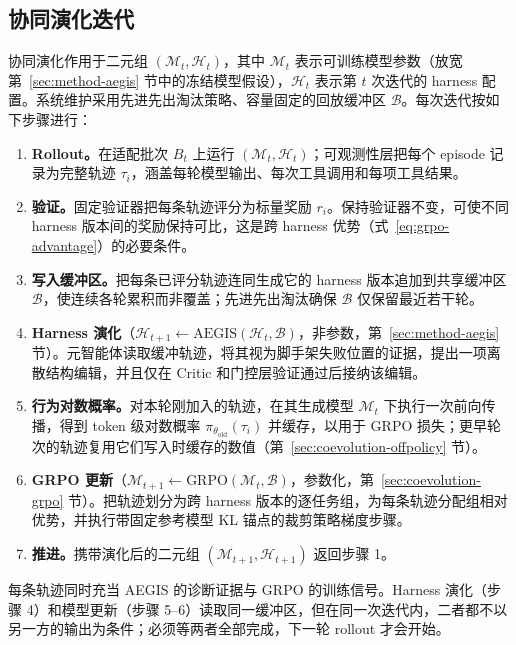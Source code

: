 \subsection{协同演化迭代}
\label{sec:coevolution-loop}

协同演化作用于二元组 $(\mathcal{M}_t,\mathcal{H}_t)$，其中 $\mathcal{M}_t$ 表示可训练模型参数（放宽第~\ref{sec:method-aegis} 节中的冻结模型假设），$\mathcal{H}_t$ 表示第 $t$ 次迭代的 harness 配置。系统维护采用先进先出淘汰策略、容量固定的回放缓冲区 $\mathcal{B}$。每次迭代按如下步骤进行：

\begin{enumerate}[leftmargin=*]
  \item \textbf{Rollout。}在适配批次 $B_t$ 上运行 $(\mathcal{M}_t,\mathcal{H}_t)$；可观测性层把每个 episode 记录为完整轨迹 $\tau_i$，涵盖每轮模型输出、每次工具调用和每项工具结果。
  \item \textbf{验证。}固定验证器把每条轨迹评分为标量奖励 $r_i$。保持验证器不变，可使不同 harness 版本间的奖励保持可比，这是跨 harness 优势（式~\ref{eq:grpo-advantage}）的必要条件。
  \item \textbf{写入缓冲区。}把每条已评分轨迹连同生成它的 harness 版本追加到共享缓冲区 $\mathcal{B}$，使连续各轮累积而非覆盖；先进先出淘汰确保 $\mathcal{B}$ 仅保留最近若干轮。
  \item \textbf{Harness 演化}（$\mathcal{H}_{t+1}\leftarrow\text{AEGIS}(\mathcal{H}_t,\mathcal{B})$，非参数，第~\ref{sec:method-aegis} 节）。元智能体读取缓冲轨迹，将其视为脚手架失败位置的证据，提出一项离散结构编辑，并且仅在 Critic 和门控层验证通过后接纳该编辑。
  \item \textbf{行为对数概率。}对本轮刚加入的轨迹，在其生成模型 $\mathcal{M}_t$ 下执行一次前向传播，得到 token 级对数概率 $\pi_{\theta_{\text{old}}}(\tau_i)$ 并缓存，以用于 GRPO 损失；更早轮次的轨迹复用它们写入时缓存的数值（第~\ref{sec:coevolution-offpolicy} 节）。
  \item \textbf{GRPO 更新}（$\mathcal{M}_{t+1}\leftarrow\text{GRPO}(\mathcal{M}_t,\mathcal{B})$，参数化，第~\ref{sec:coevolution-grpo} 节）。把轨迹划分为跨 harness 版本的逐任务组，为每条轨迹分配组相对优势，并执行带固定参考模型 KL 锚点的裁剪策略梯度步骤。
  \item \textbf{推进。}携带演化后的二元组 $(\mathcal{M}_{t+1},\mathcal{H}_{t+1})$ 返回步骤 1。
\end{enumerate}

每条轨迹同时充当 AEGIS 的诊断证据与 GRPO 的训练信号。Harness 演化（步骤 4）和模型更新（步骤 5--6）读取同一缓冲区，但在同一次迭代内，二者都不以另一方的输出为条件；必须等两者全部完成，下一轮 rollout 才会开始。

